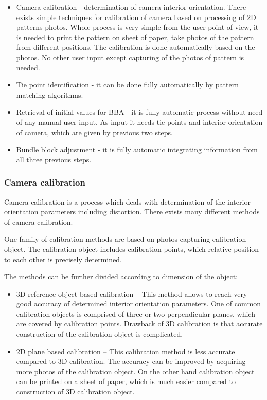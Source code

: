 \documentclass[a4paper,12pt]{article}
\begin{document}
\begin{itemize}
\item Camera calibration - determination of camera interior orientation. There exists simple techniques for calibration
of camera based on processing of 2D patterns photos. Whole process is very simple from the user point of view, it is needed 
to print the pattern on sheet of paper, take photos of the pattern from different positions. The calibration 
is done automatically based on the photos. No other user input except  capturing of the photos of pattern is needed.
\item Tie point identification - it can be done fully automatically by pattern matching algorithms.
\item Retrieval of initial values for BBA - it is fully automatic process without need of any manual user input.
As input it needs tie points and interior orientation of camera, which are given by previous two steps.
\item Bundle block adjustment - it is fully automatic integrating information from all three previous steps.
\end{itemize}

 
\subsubsection{Camera calibration}


Camera calibration is a process which deals with determination of the interior orientation parameters including distortion.
There exists many different methods of camera calibration.



One family of calibration methods are based on photos capturing calibration object.
The calibration object includes calibration points, which relative position to each other is  precisely determined.  

The methods can be further divided according to dimension of the object:


\begin{itemize}
\item 3D reference object based calibration -- This method allows to reach very good accuracy of determined 
interior orientation parameters. One of common calibration objects is comprised of three or two
perpendicular planes, which are covered by calibration points. Drawback of 3D calibration 
is that accurate construction of the calibration object is complicated.
\item 2D plane based calibration -- This calibration method is less accurate compared to 3D calibration. 
The accuracy can be improved by acquiring more photos of the calibration object.
On the other hand calibration object can be printed on a sheet of paper, which is much 
easier compared to construction of 3D calibration object.
\end{itemize}
\end{document}
